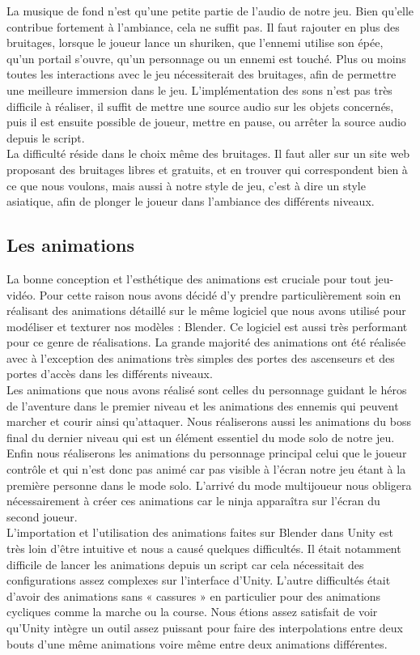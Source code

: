 \documentclass[12pt]{article}
\begin{document}
La musique de fond n'est qu'une petite partie de l'audio de notre jeu. Bien qu'elle contribue fortement  à l'ambiance, cela ne suffit pas. Il faut rajouter en plus des bruitages, lorsque le joueur lance un shuriken, que l'ennemi utilise son épée, qu'un portail s'ouvre, qu'un personnage ou un ennemi est touché. Plus ou moins toutes les interactions avec le jeu nécessiterait des bruitages, afin de permettre une meilleure immersion dans le jeu. L'implémentation des sons n'est pas très difficile à réaliser, il suffit de mettre une source audio sur les objets concernés, puis il est ensuite possible de joueur, mettre en pause, ou arrêter la source audio depuis le script.\\
La difficulté réside dans le choix même des bruitages. Il faut aller sur un site web proposant des bruitages libres et gratuits, et en trouver qui correspondent bien à ce que nous voulons, mais aussi à notre style de jeu, c'est à dire un style asiatique, afin de plonger le joueur dans l'ambiance des différents niveaux.

\subsection{Les animations}

La bonne conception et l’esthétique des animations est cruciale pour tout jeu-vidéo. Pour cette raison nous avons décidé d’y prendre particulièrement soin en réalisant des animations détaillé sur le même logiciel que nous avons utilisé pour modéliser et texturer nos modèles : Blender. Ce logiciel est aussi très performant pour ce genre de réalisations. La grande majorité des animations ont été réalisée avec à l’exception des animations très simples des portes des ascenseurs et des portes d’accès dans les différents niveaux.\\
Les animations que nous avons réalisé sont celles du personnage guidant le héros de l’aventure dans le premier niveau et les animations des ennemis qui peuvent marcher et courir ainsi qu’attaquer. Nous réaliserons aussi les animations du boss final du dernier niveau qui est un élément essentiel du mode solo de notre jeu. Enfin nous réaliserons les animations du personnage principal celui que le joueur contrôle et qui n’est donc pas animé car pas visible à l’écran notre jeu étant à la première personne dans le mode solo. L’arrivé du mode multijoueur nous obligera nécessairement à créer ces animations car le ninja apparaîtra sur l’écran du second joueur.\\
L’importation et l’utilisation des animations faites sur Blender dans Unity est très loin d’être intuitive et nous a causé quelques difficultés. Il était notamment difficile de lancer les animations depuis un script car cela nécessitait des configurations assez complexes sur l’interface d’Unity. L’autre difficultés était d’avoir des animations sans « cassures » en particulier pour des animations cycliques comme la marche ou la course. Nous étions assez satisfait de voir qu’Unity intègre un outil assez puissant pour faire des interpolations entre deux bouts d’une même animations voire même entre deux animations différentes.
\end{document}
